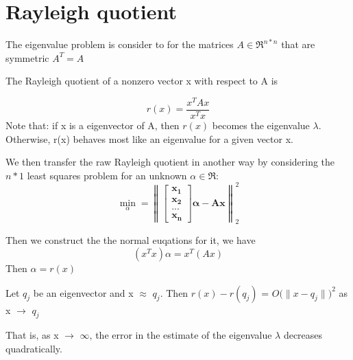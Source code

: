 \section{Rayleigh quotient}
The eigenvalue problem is consider to for the matrices $A\in \Re^{n*n}$ that are symmetric $A^T=A$
    \begin{definition}
        The Rayleigh quotient of a nonzero vector x with respect to A is 
        
        \[r(x) = \frac{x^TAx}{x^T x}\]
        Note that: if x is a eigenvector of A, then $r(x)$ becomes the eigenvalue $\lambda$. Otherwise, r(x) behaves most like an eigenvalue for a given vector x. 
    \end{definition}

We then transfer the raw Rayleigh quotient in another way by considering the $n*1$ least squares problem for an unknown $\alpha \in \Re$:
    \begin{equation}
        \min_\alpha  = \mathbf{ \left\| 
        \begin{bmatrix}
        x_1 \\ x_2 \\ ... \\ x_n
        \end{bmatrix}
        \alpha-Ax \right\|}_2 ^2
    \end{equation}

Then we construct the the normal euqations for it, we have 
    \begin{equation}
        (x^Tx)\alpha = x^T(Ax)
    \end{equation}
Then $\alpha = r(x)$


    \begin{theorem}
        Let $q_j$ be an eigenvector and x $\approx$ $q_j$. Then $r(x) - r(q_j)$ = $O({\|x-q_j\|)}^2$ as x $\rightarrow$ $q_j$
    \end{theorem}
That is, as x $\rightarrow$ $\infty$, the error in the estimate of the eigenvalue $\lambda$ decreases quadratically.



